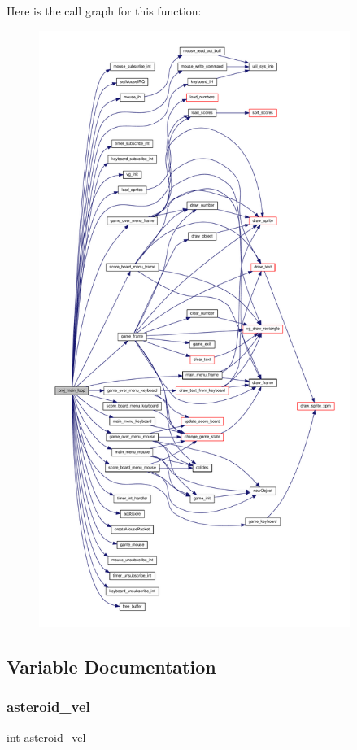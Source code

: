 Here is the call graph for this function\+:
\nopagebreak
\begin{figure}[H]
\begin{center}
\leavevmode
\includegraphics[height=550pt]{group__Proj_ga33bde23e0d2bbde847401c5ac6fb62e0_cgraph}
\end{center}
\end{figure}


\subsection{Variable Documentation}
\mbox{\label{group__Proj_gae08662d87c59faeaf7d329826dd1a0c7}} 
\subsubsection{\texorpdfstring{asteroid\+\_\+vel}{asteroid\_vel}}
{\footnotesize\ttfamily int asteroid\+\_\+vel}



